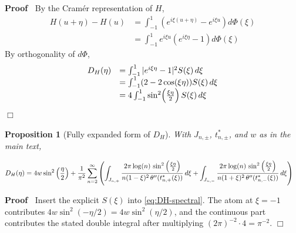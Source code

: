 \documentclass{article}
\newenvironment{proof}{\noindent\textbf{Proof\ }}{\hspace*{\fill}$\Box$\medskip}
\newtheorem{proposition}{Proposition}
\begin{document}
\begin{proof}
  By the Cram{\'e}r representation of $H$,
  \begin{equation}
    \begin{array}{ll}
      H (u + \eta) - H (u) & = \int_{- 1}^1 (e^{i \xi (u + \eta)} - e^{i \xi
      u}) d \Phi (\xi)\\
      & = \int_{- 1}^1 e^{i \xi u}  (e^{i \xi \eta} - 1) d \Phi (\xi)
    \end{array}
  \end{equation}
  By orthogonality of $d \Phi$,
  \[ \begin{array}{ll}
       D_H (\eta) & = \int_{- 1}^1 |e^{i \xi \eta} - 1|^2 S (\xi) 
       \hspace{0.17em} d \xi\\
       & = \int_{- 1}^1 (2 - 2 \cos (\xi \eta)) S (\xi)  \hspace{0.17em} d
       \xi\\
       & = 4 \int_{- 1}^1 \sin^2 \hspace{-0.17em} \left( \tfrac{\xi \eta}{2}
       \right) S (\xi)  \hspace{0.17em} d \xi
     \end{array} \]
\end{proof}

\begin{proposition}
  [Fully expanded form of $D_H$]\label{prop:DH-explicit}With $J_{n, \pm}$,
  $t^{\ast}_{n, \pm}$, and $w$ as in the main text,
  
  \begin{align}
    D_H (\eta) & = 4 w \sin^2 \left( \frac{\eta}{2} \right) + \frac{1}{\pi^2} 
    \sum_{n = 2}^{\infty} \left( \int_{J_{n, +}} \frac{2 \pi \log (n) 
    \hspace{0.17em} \sin^2 \left( \frac{\xi \eta}{2} \right)}{n (1 - \xi)^2 
    \hspace{0.17em} \theta'' (t^{\ast}_{n, +} (\xi))}  \hspace{0.17em} d \xi +
    \int_{J_{n, -}} \frac{2 \pi \log (n)  \hspace{0.17em} \sin^2 \left(
    \frac{\xi \eta}{2} \right)}{n (1 + \xi)^2  \hspace{0.17em} \theta''
    (t^{\ast}_{n, -} (\xi))}  \hspace{0.17em} d \xi \right) 
    \label{eq:DH-explicit}
  \end{align}
\end{proposition}

\begin{proof}
  Insert the explicit $S (\xi)$ into \eqref{eq:DH-spectral}. The atom at $\xi
  = - 1$ contributes $4 w \sin^2 (- \eta / 2) = 4 w \sin^2 (\eta / 2)$, and
  the continuous part contributes the stated double integral after multiplying
  $(2 \pi)^{- 2} \cdot 4 = \pi^{- 2}$.
\end{proof}
\end{document}
